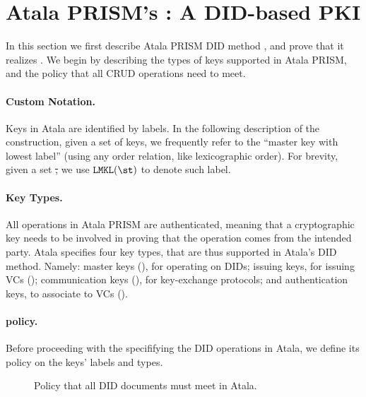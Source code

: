 \section{Atala PRISM's \RealPKIDIDAtala: A DID-based PKI}
\label{sec:did-atala}

In this section we first describe Atala PRISM DID method \RealPKIDIDAtala, and
prove that it realizes \IdealGPKIDID.
%
We begin by describing the types of keys supported in Atala PRISM, and the
policy \PAtala that all CRUD operations need to meet.

\paragraph{Custom Notation.} %
Keys in Atala are identified by labels. In the following description of the
\RealPKIDIDAtala construction, given a set of keys, we frequently refer to the
``master key with lowest label'' (using any order relation, like lexicographic
order).  For brevity, given a set \st, we use $\LMKL(\st)$ to denote such label.

\paragraph{Key Types.} %
All operations in Atala PRISM are authenticated, meaning that a cryptographic
key needs to be involved in proving that the operation comes from the intended
party. Atala specifies four key types, that are thus supported in Atala's DID
method. Namely: master keys (\MasterKey), for operating on DIDs; issuing keys,
for issuing VCs (\IssueKey); communication keys (\CommKey), for key-exchange
protocols; and authentication keys, to associate to VCs (\AuthKey).

\paragraph{\PAtala policy.} %
Before proceeding with the specififying the DID operations in Atala, we define
its policy on the keys' labels and types.

\begin{figure}[ht]
  \centering
  \caption{Policy \PAtala that all DID documents must meet in Atala.}
\end{figure}

